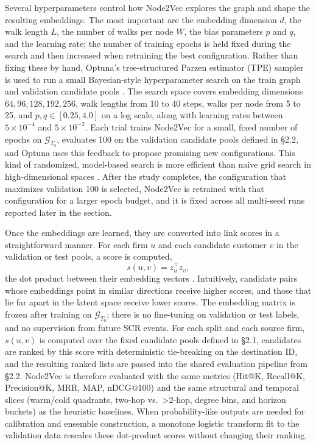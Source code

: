 Several hyperparameters control how Node2Vec explores the graph and shape the resulting embeddings. The most important are the embedding dimension $d$, the walk length $L$, the number of walks per node $W$, the bias parameters $p$ and $q$, and the learning rate; the number of training epochs is held fixed during the search and then increased when retraining the best configuration. Rather than fixing these by hand, Optuna's tree-structured Parzen estimator (TPE) sampler is used to run a small Bayesian-style hyperparameter search on the train graph and validation candidate pools \parencite{bergstra_algorithms_2011,akiba_optuna_2019}. The search space covers embedding dimensions ${64, 96, 128, 192, 256}$, walk lengths from 10 to 40 steps, walks per node from 5 to 25, and $p,q \in [0.25,4.0]$ on a log scale, along with learning rates between $5\times 10^{-4}$ and $5\times 10^{-2}$. Each trial trains Node2Vec for a small, fixed number of epochs on $\mathcal{G}_{T_0}$, evaluates 100 on the validation candidate pools defined in \S2.2, and Optuna uses this feedback to propose promising new configurations. This kind of randomized, model-based search is more efficient than naive grid search in high-dimensional spaces \parencite{bergstra_algorithms_2011,snoek_practical_2012}. After the study completes, the configuration that maximizes validation 100 is selected, Node2Vec is retrained with that configuration for a larger epoch budget, and it is fixed across all multi-seed runs reported later in the section.

Once the embeddings are learned, they are converted into link scores in a straightforward manner. For each firm \(u\) and each candidate customer \(v\) in the validation or test pools, a score is computed,
\[
s(u,v) = z_u^\top z_v,
\]
the dot product between their embedding vectors \parencite{grover_node2vec_2016}. Intuitively, candidate pairs whose embeddings point in similar directions receive higher scores, and those that lie far apart in the latent space receive lower scores. The embedding matrix is frozen after training on \(\mathcal{G}_{T_0}\); there is no fine-tuning on validation or test labels, and no supervision from future SCR events. For each split and each source firm, \(s(u,v)\) is computed over the fixed candidate pools defined in \S2.1, candidates are ranked by this score with deterministic tie-breaking on the destination ID, and the resulting ranked lists are passed into the shared evaluation pipeline from \S2.2. Node2Vec is therefore evaluated with the same metrics (Hit@K, Recall@K, Precision@K, MRR, MAP, nDCG@100) and the same structural and temporal slices (warm/cold quadrants, two-hop vs.\ >2-hop, degree bins, and horizon buckets) as the heuristic baselines. When probability-like outputs are needed for calibration and ensemble construction, a monotone logistic transform fit to the validation data rescales these dot-product scores without changing their ranking.

